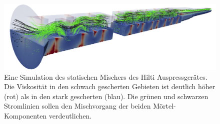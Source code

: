 \begin{table}[tb]
\noindent{}
    \caption{Die gemessenen und simulierten Konfigurationen des Mischers mit den rein scherratenabhängigen Modellen. Die angegebene Einlassgeschwindigkeit entspricht dabei der Kolbengeschwindigkeit in der FEP.}
    \label{fig:mischerVergleich}
\end{table}
%
\begin{figure}[htb]
    \centering
    \includegraphics[width=\textwidth]{figures/MischerSimResult.png}
    \caption{Eine Simulation des statischen Mischers des Hilti Auspressgerätes. Die Viskosität in den schwach gescherten Gebieten ist deutlich höher (rot) als in den stark gescherten (blau). Die grünen und schwarzen Stromlinien sollen den Mischvorgang der beiden Mörtel-Komponenten verdeutlichen.}
    \label{fig:mischerSimResult}
\end{figure}
